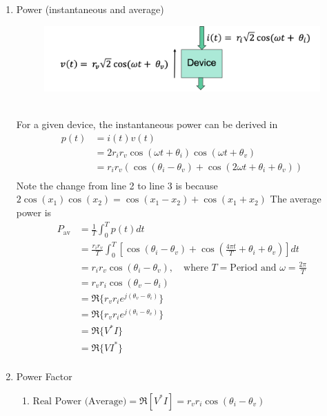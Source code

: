 \documentclass{article}
\newtheorem{exam}{Example}
\begin{document}
\begin{enumerate}
\begin{exam}
\begin{figure}[h]
            \end{figure}
        \end{exam}
        \item Power (instantaneous and average)
        \begin{figure}[h]
            \centering
            \includegraphics[width=0.75\linewidth]{image/poweri.png}
        \end{figure}\\
        For a given device, the instantaneous power can be derived in 
        \begin{align*} 
        p(t) & = i(t)v(t) \\
        &= 2r_ir_v \cos(\omega t + \theta_i) \cos(\omega t + \theta_v)\\ 
        &= r_ir_v(\cos(\theta_i - \theta_v) + \cos(2\omega t + \theta_i + \theta_v)) \\
        \end{align*} 
        Note the change from line 2 to line 3 is because $2 \cos(x_1) \cos(x_2) = \cos(x_1 - x_2) + \cos(x_1 + x_2)$
        \newpage
        The average power is 
        \begin{align*}
        P_{\text{av}} &= \frac{1}{T} \int_{0}^{T} p(t) dt \\
        &= \frac{r_i r_v}{T} \int_{0}^{T} \left[ \cos(\theta_i - \theta_v) + \cos\left(\frac{4\pi t}{T} + \theta_i + \theta_v\right) \right] dt \\
        &= r_i r_v \cos(\theta_i - \theta_v), \quad \text{where } T = \text{Period and } \omega = \frac{2\pi}{T} \\
        &= r_v r_i \cos(\theta_v - \theta_i) \\
        &= \Re\{r_v r_i e^{j(\theta_v - \theta_i)}\} \\
        &= \Re\{r_v r_i e^{j(\theta_i - \theta_v)}\} \\
        &= \Re\{V^* I\} \\
        &= \Re\{VI^*\} \\
        \end{align*}
        \item Power Factor
        \begin{enumerate}
            \item $\text{Real Power (Average)} = \Re[V^*I] = r_vr_i\cos(\theta_i-\theta_v)$

\end{enumerate}
\end{enumerate}
\end{document}
